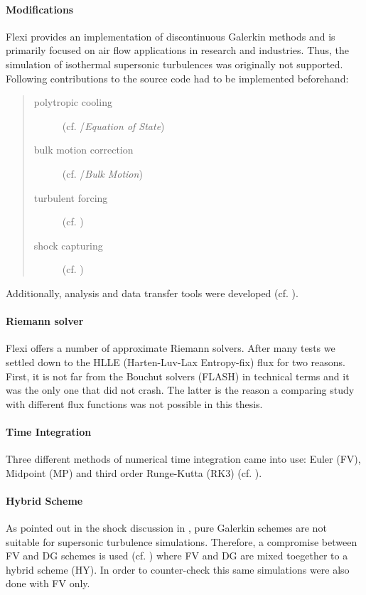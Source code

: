 \paragraph{Modifications}
Flexi provides an implementation of discontinuous Galerkin methods and is
primarily focused on air flow applications in research and industries. Thus,
the simulation of isothermal supersonic turbulences was originally not
supported.  Following contributions to the source code had to be implemented
beforehand:
\begin{quote}
\begin{description}
    \item [polytropic cooling] (cf. /\emph{Equation of State})
    \item [bulk motion correction] (cf. /\emph{Bulk Motion})
    \item [turbulent forcing] (cf. )
    \item [shock capturing] (cf. )
\end{description}
\end{quote}
Additionally, analysis and data transfer tools were developed (cf. ).

\paragraph{Riemann solver}
Flexi offers a number of approximate Riemann solvers. After many tests we
settled down to the HLLE (Harten-Luv-Lax Entropy-fix) flux for two reasons.
First, it is not far from the Bouchut solvers (FLASH) in technical terms and it
was the only one that did not crash. The latter is the reason a comparing study
with different flux functions was not possible in this thesis.

\paragraph{Time Integration}
Three different methods of numerical time integration came into use: Euler (FV),
Midpoint (MP) and third order Runge-Kutta (RK3) (cf. ).

\paragraph{Hybrid Scheme}
As pointed out in the shock discussion in , pure Galerkin schemes
are not suitable for supersonic turbulence simulations. Therefore, a compromise
between FV and DG schemes is used (cf. ) where FV and DG
are mixed toegether to a hybrid scheme (HY). In order to counter-check this
same simulations were also done with FV only.
